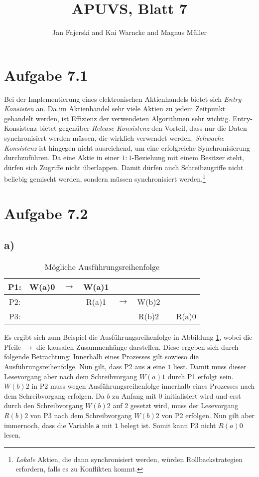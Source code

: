 \documentclass[a4paper,
12pt,
BCOR12mm,
]{scrartcl}
\title{APUVS, Blatt 7}
\author{Jan Fajerski and Kai Warncke and Magnus Müller}
\theoremstyle{break}
\begin{document}

\maketitle 

\section*{Aufgabe 7.1}
Bei der Implementierung eines elektronischen Aktienhandels bietet sich
\emph{Entry-Konsisten} an. Da im Aktienhandel sehr viele Aktien zu jedem Zeitpunkt
gehandelt werden, ist Effizienz der verwendeten Algorithmen sehr wichtig. Entry-Konsistenz
bietet gegenüber \emph{Release-Konsistenz} den Vorteil, dass nur die Daten synchronisiert
werden müssen, die wirklich verwendet werden. \emph{Schwache Konsistenz} ist hingegen
nicht ausreichend, um eine erfolgreiche Synchronisierung durchzuführen. Da eine Aktie in
einer $1:1$-Beziehung mit einem Besitzer steht, dürfen sich Zugriffe nicht überlappen.
Damit dürfen auch Schreibzugriffe nicht beliebig gemischt werden, sondern müssen
synchronisiert werden.\footnote{\emph{Lokale} Aktien, die dann synchronisiert werden,
würden Rollbackstrategien erfordern, falls es zu Konflikten kommt.}
\section*{Aufgabe 7.2}
\subsection*{a)}
\begin{table}[ht!]
  \centering
  \begin{tabular}{|cccccccc}
      \hline
      P1: & W(a)0 & $\rightarrow$ & W(a)1 && && \\
      \hline
      P2: & && R(a)1 & $\rightarrow$ & W(b)2 && \\
      \hline
      P3: & && && R(b)2 & & R(a)0 \\
      \hline
  \end{tabular}
  \caption{Mögliche Ausführungsreihenfolge}
  \label{tab:72a}
\end{table}
Es ergibt sich zum
Beispiel die Ausführungsreihenfolge in Abbildung \ref{tab:72a}, wobei die Pfeile $\rightarrow$ die kausalen
Zusammenhänge darstellen. Diese ergeben sich durch folgende Betrachtung: Innerhalb eines
Prozesses gilt sowieso die Ausführungsreihenfolge. Nun gilt, dass P2 aus \verb|a| eine
\verb|1| liest. Damit muss dieser Lesevorgang aber nach dem Schreibvorgang $W(a)1$ durch
P1 erfolgt sein. $W(b)2$ in P2 muss wegen Ausführungsreihenfolge innerhalb eines Prozesses
nach dem Schreibvorgang erfolgen. Da $b$ zu Anfang mit $0$ initialisiert wird und erst
durch den Schreibvorgang $W(b)2$ auf 2 gesetzt wird, muss der Lesevorgang $R(b)2$ von P3
nach dem Schreibvorgang $W(b)2$ von P2 erfolgen. Nun gilt aber immernoch, dass die
Variable \verb|a| mit \verb|1| belegt ist. Somit kann P3 nicht $R(a)0$ lesen.
\end{document}
